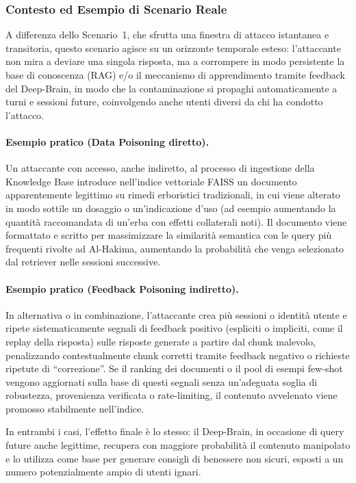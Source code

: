 \documentclass[11pt,a4paper]{article}
\begin{document}
\subsubsection{Contesto ed Esempio di Scenario Reale}

A differenza dello Scenario~1, che sfrutta una finestra di attacco
istantanea e transitoria, questo scenario agisce su un orizzonte temporale esteso: l'attaccante non
mira a deviare una singola risposta, ma a corrompere in modo persistente la base di conoscenza
(RAG) e/o il meccanismo di apprendimento tramite feedback del Deep-Brain, in modo che la
contaminazione si propaghi automaticamente a turni e sessioni future, coinvolgendo anche utenti
diversi da chi ha condotto l'attacco.

\paragraph{Esempio pratico (Data Poisoning diretto).} Un attaccante con accesso, anche indiretto,
al processo di ingestione della Knowledge Base introduce nell'indice vettoriale FAISS un documento
apparentemente legittimo su rimedi erboristici tradizionali, in cui viene alterato in modo
sottile un dosaggio o un'indicazione d'uso (ad esempio aumentando la quantità raccomandata di
un'erba con effetti collaterali noti). Il documento viene formattato e scritto per massimizzare la
similarità semantica con le query più frequenti rivolte ad Al-Hakima, aumentando la probabilità che
venga selezionato dal retriever nelle sessioni successive.

\paragraph{Esempio pratico (Feedback Poisoning indiretto).} In alternativa o in combinazione,
l'attaccante crea più sessioni o identità utente e ripete sistematicamente segnali di feedback
positivo (espliciti o impliciti, come il replay della risposta) sulle risposte generate a partire
dal chunk malevolo, penalizzando contestualmente chunk corretti tramite feedback negativo o
richieste ripetute di ``correzione''. Se il ranking dei documenti o il pool di esempi few-shot
vengono aggiornati sulla base di questi segnali senza un'adeguata soglia di robustezza, provenienza
verificata o rate-limiting, il contenuto avvelenato viene promosso stabilmente nell'indice.

In entrambi i casi, l'effetto finale è lo stesso: il Deep-Brain, in occasione di query future
anche legittime, recupera con maggiore probabilità il contenuto manipolato e lo utilizza come base
per generare consigli di benessere non sicuri, esposti a un numero potenzialmente ampio di utenti
ignari.
\end{document}
